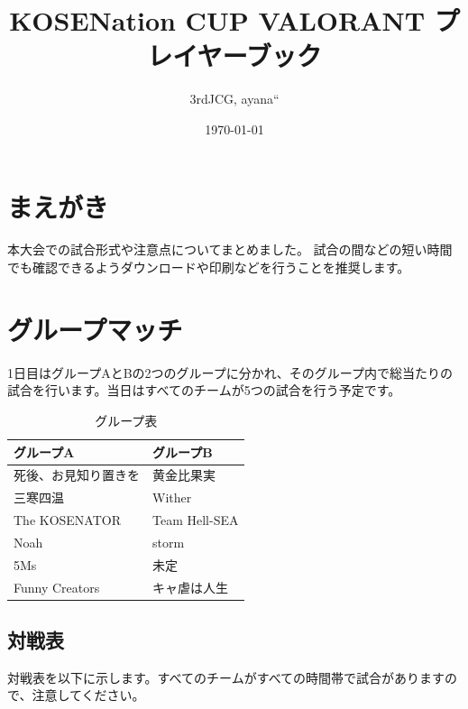 \documentclass[uplatex,dvipdfmx]{jsarticle}
\title{KOSENation CUP VALORANT プレイヤーブック}
\author{\hfill 3rdJCG, ayana``}
\date{\today}
\begin{document}
\maketitle

\section{まえがき}
	本大会での試合形式や注意点についてまとめました。
	試合の間などの短い時間でも確認できるようダウンロードや印刷などを行うことを推奨します。

\section{グループマッチ}
	1日目はグループAとBの2つのグループに分かれ、そのグループ内で総当たりの試合を行います。当日はすべてのチームが5つの試合を行う予定です。

	\begin{table}[htbp]
	    \centering
	    \caption{グループ表}
	    \begin{tabular}{p{}|p{}}
	        \hline
	        {\bf グループA}       & {\bf グループB}  \\ \hline
	        死後、お見知り置きを  & 黄金比果実       \\ \hline
	        三寒四温              & Wither           \\ \hline
	        The KOSENATOR         & Team Hell-SEA    \\ \hline
	        Noah                  & storm            \\ \hline
	        5Ms                   & 未定             \\ \hline
	        Funny Creators        & キャ虐は人生     \\ \hline
	    \end{tabular}
	\end{table}


	\subsection{対戦表}
	    対戦表を以下に示します。すべてのチームがすべての時間帯で試合がありますので、注意してください。
\end{document}
